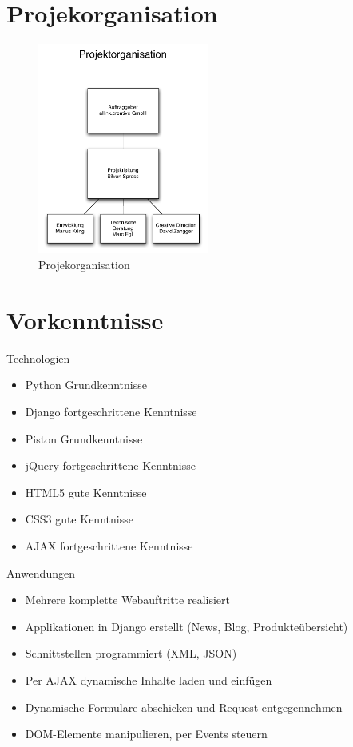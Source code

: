 \section{Projekorganisation}

\begin{figure}[!ht]
\begin{center}
\includegraphics[width=0.5\textwidth,angle=0]{./bilder/01_projektorganisation.pdf}
\caption[Projekorganisation]{Projekorganisation\footnotemark}
\end{center}
\end{figure}

\section{Vorkenntnisse}

Technologien
\begin{itemize}
    \item Python Grundkenntnisse
    \item Django fortgeschrittene Kenntnisse
    \item Piston Grundkenntnisse
    \item jQuery fortgeschrittene Kenntnisse
    \item HTML5 gute Kenntnisse
    \item CSS3 gute Kenntnisse
    \item AJAX fortgeschrittene Kenntnisse\\
\end{itemize}

Anwendungen
\begin{itemize}
    \item Mehrere komplette Webauftritte realisiert
    \item Applikationen in Django erstellt (News, Blog, Produkteübersicht)
    \item Schnittstellen programmiert (XML, JSON)
    \item Per AJAX dynamische Inhalte laden und einfügen
    \item Dynamische Formulare abschicken und Request entgegennehmen
    \item DOM-Elemente manipulieren, per Events steuern
\end{itemize}
    
